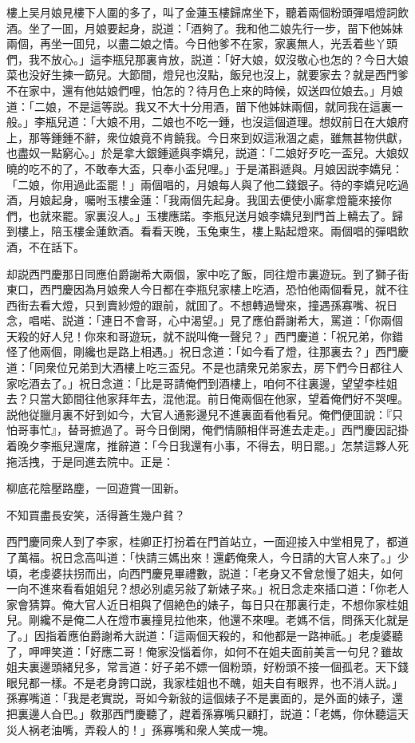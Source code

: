 樓上吴月娘見樓下人圍的多了，叫了金蓮玉樓歸席坐下，聽着兩個粉頭彈唱燈詞飲酒。坐了一囬，月娘要起身，説道：「酒夠了。我和他二娘先行一步，㽞下他姊妹兩個，再坐一囬兒，以盡二娘之情。今日他爹不在家，家裏無人，光丢着些丫頭們，我不放心。」這李瓶兒那裏肯放，説道：「好大娘，奴沒敬心也怎的？今日大娘菜也没好生揀一筯兒。大節間，燈兒也沒點，飯兒也沒上，就要家去？就是西門爹不在家中，還有他姑娘們哩，怕怎的？待月色上來的時候，奴送四位娘去。」月娘道：「二娘，不是這等説。我又不大十分用酒，㽞下他姊妹兩個，就同我在這裏一般。」李瓶兒道：「大娘不用，二娘也不吃一鍾，也沒這個道理。想奴前日在大娘府上，那等鍾鍾不辭，衆位娘竟不肯饒我。今日來到奴這湫涸之處，雖無甚物供獻，也盡奴一點窮心。」於是拿大銀鍾遞與李嬌兒，説道：「二娘好歹吃一盃兒。大娘奴曉的吃不的了，不敢奉大盃，只奉小盃兒哩。」于是滿斟遞與。月娘因説李嬌兒：「二娘，你用過此盃罷！」兩個唱的，月娘每人與了他二錢銀子。待的李嬌兒吃過酒，月娘起身，囑咐玉樓金蓮：「我兩個先起身。我囬去便使小廝拿燈籠來接你們，也就來罷。家裏沒人。」玉樓應諾。李瓶兒送月娘李嬌兒到門首上轎去了。歸到樓上，陪玉樓金蓮飲酒。看看天晚，玉兔東生，樓上點起燈來。兩個唱的彈唱飲酒，不在話下。

却説西門慶那日同應伯爵謝希大兩個，家中吃了飯，同往燈市裏遊玩。到了獅子街東口，西門慶因為月娘衆人今日都在李瓶兒家樓上吃酒，恐怕他兩個看見，就不往西街去看大燈，只到賣紗燈的跟前，就囬了。不想轉過彎來，撞遇孫寡嘴、祝日念，唱喏、説道：「連日不會哥，心中渴望。」見了應伯爵謝希大，罵道：「你兩個天殺的好人兒！你來和哥遊玩，就不説叫俺一聲兒？」西門慶道：「祝兄弟，你錯怪了他兩個，剛纔也是路上相遇。」祝日念道：「如今看了燈，往那裏去？」西門慶道：「同衆位兄弟到大酒樓上吃三盃兒。不是也請衆兄弟家去，房下們今日都往人家吃酒去了。」祝日念道：「比是哥請俺們到酒樓上，咱何不往裏邊，望望李桂姐去？只當大節間往他家拜年去，混他混。前日俺兩個在他家，望着俺們好不哭哩。説他従臘月裏不好到如今，大官人通影邊兒不進裏面看他看兒。俺們便囬說：『只怕哥事忙』，替哥摭過了。哥今日倒閑，俺們情願相伴哥進去走走。」西門慶因記掛着晚夕李瓶兒還席，推辭道：「今日我還有小事，不得去，明日罷。」怎禁這夥人死拖活拽，于是同進去院中。正是：

柳底花陰壓路塵，一回遊賞一囬新。

不知買盡長安笑，活得蒼生幾户貧？

西門慶同衆人到了李家，桂卿正打扮着在門首站立，一面迎接入中堂相見了，都道了萬福。祝日念高叫道：「快請三媽出來！還虧俺衆人，今日請的大官人來了。」少頃，老虔婆扶拐而出，向西門慶見畢禮數，説道：「老身又不曾怠慢了姐夫，如何一向不進來看看姐姐兒？想必別處另敍了新婊子來。」祝日念走來插口道：「你老人家會猜算。俺大官人近日相與了個絶色的婊子，每日只在那裏行走，不想你家桂姐兒。剛纔不是俺二人在燈市裏撞見拉他來，他還不來哩。老媽不信，問孫天化就是了。」因指着應伯爵謝希大説道：「這兩個天殺的，和他都是一路神祇。」老虔婆聽了，呷呷笑道：「好應二哥！俺家没惱着你，如何不在姐夫面前美言一句兒？雖故姐夫裏邊頭緒兒多，常言道：好子弟不嫖一個粉頭，好粉頭不接一個孤老。天下錢眼兒都一樣。不是老身誇口説，我家桂姐也不醜，姐夫自有眼界，也不消人説。」孫寡嘴道：「我是老實説，哥如今新敍的這個婊子不是裏面的，是外面的婊子，還把裏邊人㒲巴。」敎那西門慶聽了，趕着孫寡嘴只顧打，説道：「老媽，你休聽這天災人祸老油嘴，弄殺人的！」孫寡嘴和衆人笑成一塊。

